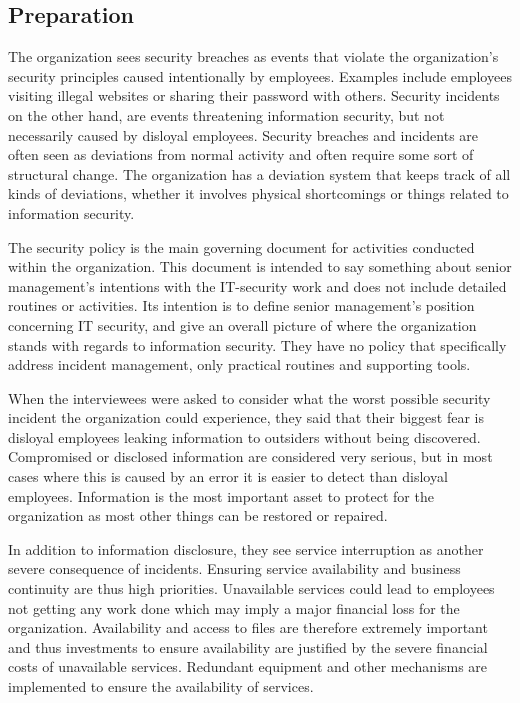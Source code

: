 \subsection{Preparation}
The organization sees security breaches as events that violate the organization's security principles caused intentionally by employees. Examples include employees visiting illegal websites or sharing their password with others. Security incidents on the other hand, are events threatening information security, but not necessarily caused by disloyal employees. Security breaches and incidents are often seen as deviations from normal activity and often require some sort of structural change. The organization has a deviation system that keeps track of all kinds of deviations, whether it involves physical shortcomings or things related to information security.

The security policy is the main governing document for activities conducted within the organization. This document is intended to say something about senior management's intentions with the IT-security work and does not include detailed routines or activities. Its intention is to define senior management's position concerning IT security, and give an overall picture of where the organization stands with regards to information security. They have no policy that specifically address incident management, only practical routines and supporting tools.

When the interviewees were asked to consider what the worst possible security incident the organization could experience, they said that their biggest fear is disloyal employees leaking information to outsiders without being discovered. Compromised or disclosed information are considered very serious, but in most cases where this is caused by an error it is easier to detect than disloyal employees. Information is the most important asset to protect for the organization as most other things can be restored or repaired.

In addition to information disclosure, they see service interruption as another severe consequence of incidents. Ensuring service availability and business continuity are thus high priorities. Unavailable services could lead to employees not getting any work done which may imply a major financial loss for the organization. Availability and access to files are therefore extremely important and thus investments to ensure availability are justified by the severe financial costs of unavailable services. Redundant equipment and other mechanisms are implemented to ensure the availability of services. 

